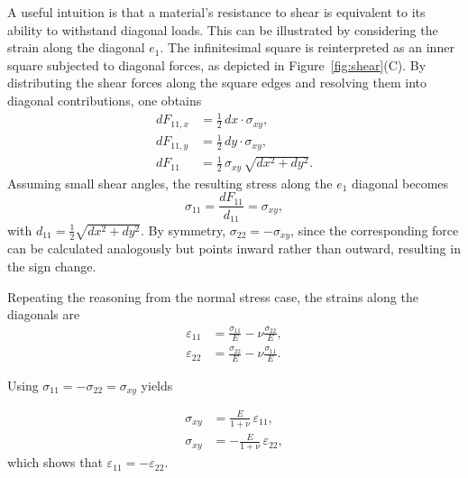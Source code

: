 A useful intuition is that a material’s resistance to shear is equivalent to its ability to withstand diagonal loads. This can be illustrated by considering the strain along the diagonal $e_1$. The infinitesimal square is reinterpreted as an inner square subjected to diagonal forces, as depicted in Figure~\ref{fig:shear}(C). By distributing the shear forces along the square edges and resolving them into diagonal contributions, one obtains
\begin{align*}
dF_{11,x} &= \tfrac{1}{2}\,dx \cdot \sigma_{xy}, \\
dF_{11,y} &= \tfrac{1}{2}\,dy \cdot \sigma_{xy}, \\
dF_{11} &= \tfrac{1}{2}\,\sigma_{xy}\,\sqrt{dx^2+dy^2}.
\end{align*}
Assuming small shear angles, the resulting stress along the $e_1$ diagonal becomes
\begin{equation*}
\sigma_{11} = \frac{dF_{11}}{d_{11}}=\sigma_{xy},
\end{equation*}
with $d_{11}=\tfrac{1}{2}\sqrt{dx^2+dy^2}$. By symmetry, $\sigma_{22}=-\sigma_{xy}$, since the corresponding force can be calculated analogously but points inward rather than outward, resulting in the sign change.

Repeating the reasoning from the normal stress case, the strains along the diagonals are
\begin{align}
\label{eq}
\varepsilon_{11} &= \frac{\sigma_{11}}{E} - \nu \frac{\sigma_{22}}{E}, \\
\varepsilon_{22} &= \frac{\sigma_{22}}{E} - \nu \frac{\sigma_{11}}{E}.
\end{align}

Using $\sigma_{11}=-\sigma_{22}=\sigma_{xy}$ yields

\begin{align}
\sigma_{xy} &= \frac{E}{1+\nu}\,\varepsilon_{11}, \\
\sigma_{xy} &= -\frac{E}{1+\nu}\,\varepsilon_{22},
\label{eq:sigma_xy}
\end{align}
which shows that $\varepsilon_{11} = -\varepsilon_{22}$.

